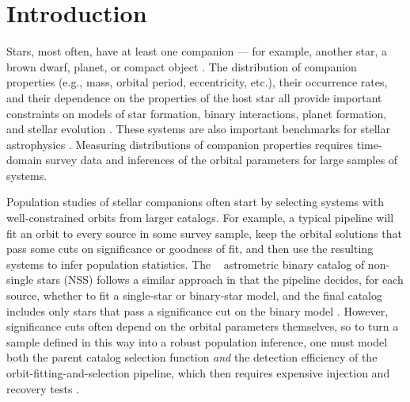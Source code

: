 \documentclass[twocolumn]{AASTeX7/aastex701}
\begin{document}
\section{Introduction}
\label{sec:intro}

Stars, most often, have at least one companion --- for example, another star, a brown
dwarf, planet, or compact object \citep[e.g.,][]{Duquennoy:1991, Cassan:2012, Moe:2017,
Offner:2023, Gaia:Arenou:2023, ElBadry:2024-ns}.
The distribution of companion properties (e.g., mass, orbital period, eccentricity,
etc.), their occurrence rates, and their dependence on the properties of the host star
all provide important constraints on models of star formation, binary interactions,
planet formation, and stellar evolution \citep[e.g.,][]{Fischer:2005, Sana:2012,
Duchene:2013, Moe:2019, Zhu:2021, ElBadry:2024-GaiaBinary}.
These systems are also important benchmarks for stellar astrophysics
\citep{Andersen:1991, Torres:2010, Mann:2019}.
Measuring distributions of companion properties requires time-domain survey data and
inferences of the orbital parameters for large samples of systems.

Population studies of stellar companions often start by selecting systems with
well-constrained orbits from larger catalogs.
For example, a typical pipeline will fit an orbit to every source in some survey sample,
keep the orbital solutions that pass some cuts on significance or goodness of fit, and
then use the resulting systems to infer population statistics.
The \gaia\  astrometric binary catalog of non-single stars (NSS) follows a similar
approach in that the pipeline decides, for each source, whether to fit a single-star or
binary-star model, and the final catalog includes only stars that pass a significance
cut on the binary model \citep{Halbwachs:2023, GaiaDR3Multiplicity}.
However, significance cuts often depend on the orbital parameters themselves, so to turn
a sample defined in this way into a robust population inference, one must model both
the parent catalog selection function \textsl{and} the detection efficiency of the
orbit-fitting-and-selection pipeline, which then requires expensive injection and
recovery tests \citep[e.g.,][]{Cumming:2008, Christiansen:2020, Rosenthal:2021,
ElBadry:2024-gaiamock}.
\end{document}
